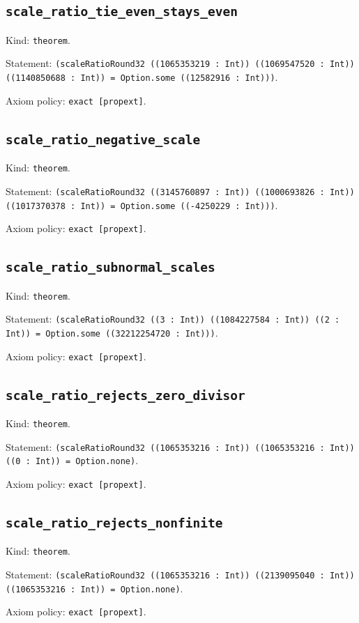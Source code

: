 \documentclass[11pt]{article}
\begin{document}
\subsection*{\texttt{scale\_ratio\_tie\_even\_stays\_even}}
\noindent Kind: \texttt{theorem}.\par
\noindent Statement: \texttt{(scaleRatioRound32 ((1065353219 : Int)) ((1069547520 : Int)) ((1140850688 : Int)) = Option.some ((12582916 : Int)))}.\par
\noindent Axiom policy: \texttt{exact [propext]}.\par
\subsection*{\texttt{scale\_ratio\_negative\_scale}}
\noindent Kind: \texttt{theorem}.\par
\noindent Statement: \texttt{(scaleRatioRound32 ((3145760897 : Int)) ((1000693826 : Int)) ((1017370378 : Int)) = Option.some ((-4250229 : Int)))}.\par
\noindent Axiom policy: \texttt{exact [propext]}.\par
\subsection*{\texttt{scale\_ratio\_subnormal\_scales}}
\noindent Kind: \texttt{theorem}.\par
\noindent Statement: \texttt{(scaleRatioRound32 ((3 : Int)) ((1084227584 : Int)) ((2 : Int)) = Option.some ((32212254720 : Int)))}.\par
\noindent Axiom policy: \texttt{exact [propext]}.\par
\subsection*{\texttt{scale\_ratio\_rejects\_zero\_divisor}}
\noindent Kind: \texttt{theorem}.\par
\noindent Statement: \texttt{(scaleRatioRound32 ((1065353216 : Int)) ((1065353216 : Int)) ((0 : Int)) = Option.none)}.\par
\noindent Axiom policy: \texttt{exact [propext]}.\par
\subsection*{\texttt{scale\_ratio\_rejects\_nonfinite}}
\noindent Kind: \texttt{theorem}.\par
\noindent Statement: \texttt{(scaleRatioRound32 ((1065353216 : Int)) ((2139095040 : Int)) ((1065353216 : Int)) = Option.none)}.\par
\noindent Axiom policy: \texttt{exact [propext]}.\par
\end{document}
